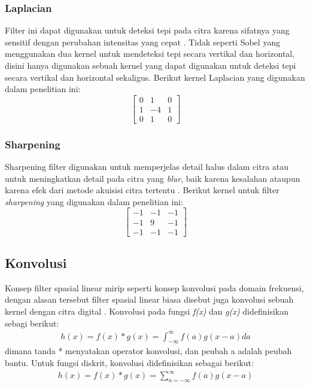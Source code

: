 \subsubsection{Laplacian}
Filter ini dapat digunakan untuk deteksi tepi pada citra karena sifatnya yang sensitif dengan perubahan intensitas yang cepat . Tidak seperti Sobel yang menggunakan dua kernel untuk mendeteksi tepi secara vertikal dan horizontal, disini hanya digunakan sebuah kernel yang dapat digunakan untuk deteksi tepi secara vertikal dan horizontal sekaligus. Berikut kernel Laplacian yang digunakan dalam penelitian ini:
\begin{equation*}
    \label{kernel:laplasHP}
    \left[
    \begin{matrix}
        0 & 1 & 0 \\
        1 & -4 & 1 \\
        0 & 1 & 0
    \end{matrix}
    \right]
\end{equation*}

\subsubsection{Sharpening}
Sharpening filter digunakan untuk memperjelas detail halus dalam citra atau untuk meningkatkan detail pada citra yang \textit{blur}, baik karena kesalahan ataupun karena efek dari metode akuisisi citra tertentu . Berikut kernel untuk filter \textit{sharpening} yang digunakan dalam penelitian ini:
\begin{equation*}
    \label{kernel:sharpening}
    \left[
    \begin{matrix}
        -1 & -1 & -1 \\
        -1 & 9 & -1 \\
        -1 & -1 & -1
    \end{matrix}
    \right]
\end{equation*}


\subsection{Konvolusi}
Konsep filter spasial linear mirip seperti konsep konvolusi pada domain frekuensi, dengan alasan tersebut filter spasial linear biasa disebut juga konvolusi sebuah kernel dengan citra digital . Konvolusi pada fungsi \textit{f(x)} dan \textit{g(x)} didefinisikan sebagi berikut:
\begin{equation}
    \label{eq:conv1}
    \begin{split}
        h(x) = f(x) * g(x) = \int_{-\infty}^{\infty} f(a) g(x-a) da
    \end{split}
\end{equation}
dimana tanda * menyatakan operator konvolusi, dan peubah a adalah peubah bantu. Untuk fungsi diskrit, konvolusi didefinisikan sebagai berikut:
\begin{equation}
    \label{eq:conv2}
    \begin{split}
         h(x) = f(x) * g(x) = \sum_{a=-\infty}^{\infty} f(a)g(x-a)
    \end{split}
\end{equation}

